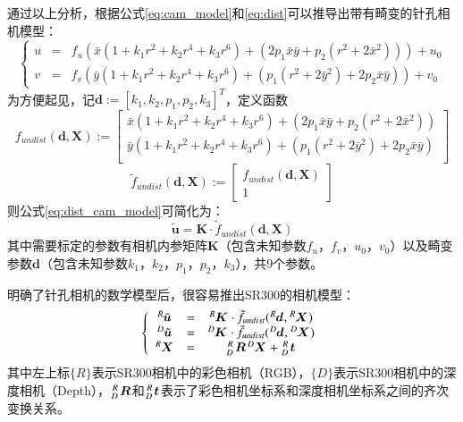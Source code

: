 通过以上分析，根据公式\ref{eq:cam_model}和\ref{eq:dist}可以推导出带有畸变的针孔相机模型：
\begin{equation}
  \label{eq:dist_cam_model}
  \left\{
    \begin{array}{ccc}
      u&=&f_u(\bar{x}(1 + k_1r^2 + k_2r^4 + k_3r^6) + (2p_1\bar{x}\bar{y} + p_2(r^2 + 2\bar{x}^2))) + u_0\\
      v&=&f_v(\bar{y}(1 + k_1r^2 + k_2r^4 + k_3r^6) + (p_1(r^2 + 2\bar{y}^2) + 2p_2\bar{x}\bar{y})) + v_0
    \end{array}
  \right.
\end{equation}
为方便起见，记$\bm{d}:=[k_1,k_2,p_1,p_2,k_3]^T$，定义函数
\begin{equation}
  f_{undist}(\bm{d}, \bm{X}):=\left[
    \begin{array}{ccc}
      \bar{x}(1 + k_1r^2 + k_2r^4 + k_3r^6) + (2p_1\bar{x}\bar{y} + p_2(r^2 + 2\bar{x}^2))\\
      \bar{y}(1 + k_1r^2 + k_2r^4 + k_3r^6) + (p_1(r^2 + 2\bar{y}^2) + 2p_2\bar{x}\bar{y})\\
    \end{array}
  \right]
\end{equation}
\begin{equation}
  \tilde{f}_{undist}(\bm{d}, \bm{X}):=\left[
    \begin{array}{c}
      f_{undist}(\bm{d}, \bm{X})\\
      1
    \end{array}
  \right]
\end{equation}
则公式\ref{eq:dist_cam_model}可简化为：
\begin{equation}
  \tilde{\bm{u}} = \bm{K}\cdot \tilde{f}_{undist}(\bm{d}, \bm{X})
\end{equation}
其中需要标定的参数有相机内参矩阵$\bm{K}$（包含未知参数$f_u$，$f_v$，$u_0$，$v_0$）以及畸变参数$\bm{d}$（包含未知参数$k_1$，$k_2$，$p_1$，$p_2$，$k_3$），共9个参数。

明确了针孔相机的数学模型后，很容易推出SR300的相机模型：
\begin{equation}
  \label{eq:rgbd_cam_model}
  \left\{
    \begin{array}{ccc}
      \tensor*[^R]{\tilde{\bm{u}}}{}&=&\tensor*[^R]{\bm{K}}{}\cdot \tilde{f}_{undist}(\tensor*[^R]{\bm{d}}{},\tensor*[^R]{\bm{X}}{})\\
      \tensor*[^D]{\tilde{\bm{u}}}{}&=&\tensor*[^D]{\bm{K}}{}\cdot \tilde{f}_{undist}(\tensor*[^D]{\bm{d}}{},\tensor*[^D]{\bm{X}}{})\\
      \tensor*[^R]{\bm{X}}{} &=& \tensor*[^R_D]{\,\bm{R}}{}\tensor*[^D]{\bm{X}}{} + \tensor*[^R_D]{\,\bm{t}}{}
    \end{array}
  \right.
\end{equation}
其中左上标$\{R\}$表示SR300相机中的彩色相机（RGB），$\{D\}$表示SR300相机中的深度相机（Depth），$\tensor*[^R_D]{\,\bm{R}}{}$和$\tensor*[^R_D]{\,\bm{t}}{}$表示了彩色相机坐标系和深度相机坐标系之间的齐次变换关系。

